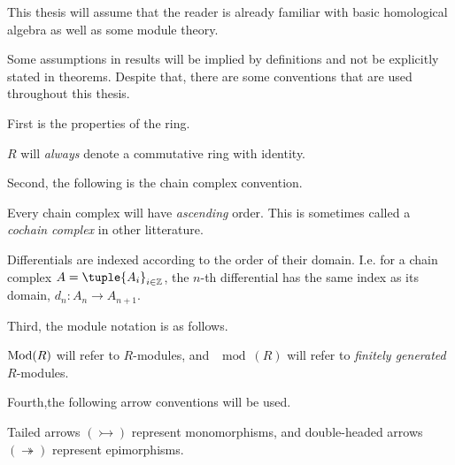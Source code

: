 This thesis will assume that the reader is already familiar with basic homological algebra as well as some module theory.

Some assumptions in results will be implied by definitions and not be explicitly stated in theorems. Despite that, there are some conventions that are used throughout this thesis.

First is the properties of the ring.
\begin{notation}
    \( R \) will \emph{always} denote a commutative ring with identity.
\end{notation}

Second, the following is the chain complex convention.
\begin{notation}
    \label{not:chain_complex}
    Every chain complex will have \emph{ascending} order. This is sometimes called a \emph{cochain complex} in other litterature.

    Differentials are indexed according to the order of their domain. I.e. for a chain complex \( A = \tuple{A_i}_{i \in \Zb} \), the \( n \)-th differential has the same index as its domain, \( d_n: A_n \to A_{n + 1} \).
\end{notation}

Third, the module notation is as follows.
\begin{notation}
    \( \operatorname{Mod}(R) \) will refer to \( R \)-modules, and \( \mod(R) \) will refer to \emph{finitely generated} \( R \)-modules.
\end{notation}

Fourth,the following arrow conventions will be used.
\begin{notation}
    Tailed arrows \( (\rightarrowtail) \) represent monomorphisms, and double-headed arrows \( (\twoheadrightarrow) \) represent epimorphisms.
\end{notation}

